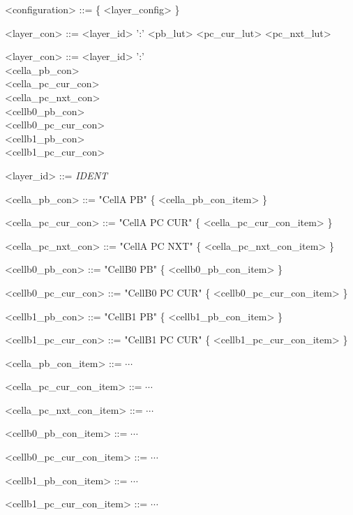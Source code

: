 \documentclass{article}
\begin{document}
\begin{grammar} \small

{\renewcommand\baselinestretch{0}\selectfont

<configuration>   ::= \{ <layer\_config> \}

<layer\_con>     ::=   <layer\_id> ':' <pb\_lut>  <pc\_cur\_lut>  <pc\_nxt\_lut>


<layer\_con>     ::=   <layer\_id> ':'   \\
     \hspace*{1.58cm}    <cella\_pb\_con>    \\
     \hspace*{1.58cm}    <cella\_pc\_cur\_con>   \\
     \hspace*{1.58cm}    <cella\_pc\_nxt\_con>  \\
     \hspace*{1.58cm}    <cellb0\_pb\_con>   \\
     \hspace*{1.58cm}    <cellb0\_pc\_cur\_con>   \\
     \hspace*{1.58cm}    <cellb1\_pb\_con>    \\
     \hspace*{1.58cm}    <cellb1\_pc\_cur\_con>

<layer\_id>     ::=   \emph{IDENT}

<cella\_pb\_con>     ::=   "CellA PB"  \{ <cella\_pb\_con\_item> \}

<cella\_pc\_cur\_con>     ::=   "CellA PC CUR"  \{ <cella\_pc\_cur\_con\_item> \}

<cella\_pc\_nxt\_con>     ::=   "CellA PC NXT"  \{ <cella\_pc\_nxt\_con\_item> \}

<cellb0\_pb\_con>     ::=   "CellB0 PB"  \{ <cellb0\_pb\_con\_item> \}

<cellb0\_pc\_cur\_con>     ::=   "CellB0 PC CUR"  \{ <cellb0\_pc\_cur\_con\_item> \}

<cellb1\_pb\_con>     ::=   "CellB1 PB"  \{ <cellb1\_pb\_con\_item> \}

<cellb1\_pc\_cur\_con>     ::=   "CellB1 PC CUR"  \{ <cellb1\_pc\_cur\_con\_item> \}

<cella\_pb\_con\_item>     ::=   $\cdots$

<cella\_pc\_cur\_con\_item>     ::=   $\cdots$

<cella\_pc\_nxt\_con\_item>     ::=   $\cdots$

<cellb0\_pb\_con\_item>     ::=   $\cdots$

<cellb0\_pc\_cur\_con\_item>     ::=   $\cdots$

<cellb1\_pb\_con\_item>     ::=   $\cdots$

<cellb1\_pc\_cur\_con\_item>     ::=   $\cdots$

\par}

\end{grammar}
\end{document}
